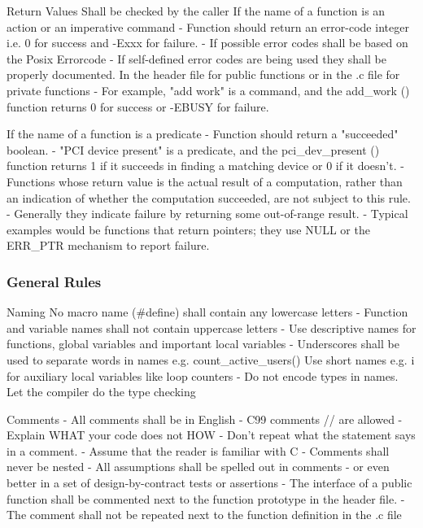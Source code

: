 \begin{definition}{Return Values}
    Shall be checked by the caller
If the name of a function is an action or an imperative command
- Function should return an error-code integer i.e. 0 for success and -Exxx for failure.
- If possible error codes shall be based on the Posix Errorcode
- If self-defined error codes are being used they shall be properly documented. In the header file for public functions or in the .c file for private functions
- For example, "add work" is a command, and the add\_work () function returns 0 for success or -EBUSY for failure.

If the name of a function is a predicate
- Function should return a "succeeded" boolean.
- "PCI device present" is a predicate, and the pci\_dev\_present () function returns 1 if it succeeds in finding a matching device or 0 if it doesn't.
- Functions whose return value is the actual result of a computation, rather than an indication of whether the computation succeeded, are not subject to this rule.
- Generally they indicate failure by returning some out-of-range result.
- Typical examples would be functions that return pointers; they use NULL or the ERR\_PTR mechanism to report failure.
\end{definition}

\multend

\subsubsection{General Rules}


\begin{definition}{Naming}
No macro name (\#define) shall contain any lowercase letters
- Function and variable names shall not contain uppercase letters
- Use descriptive names for functions, global variables and important local variables
- Underscores shall be used to separate words in names e.g. count\_active\_users()
Use short names e.g. i for auxiliary local variables like loop counters
- Do not encode types in names. Let the compiler do the type checking
\end{definition}

\begin{definition}{Comments}
    - All comments shall be in English
- C99 comments // are allowed
- Explain WHAT your code does not HOW
- Don't repeat what the statement says in a comment.
- Assume that the reader is familiar with C
- Comments shall never be nested
- All assumptions shall be spelled out in comments
- or even better in a set of design-by-contract tests or assertions
- The interface of a public function shall be commented next to the function prototype in the header file.
- The comment shall not be repeated next to the function definition in the .c file
\end{definition}

